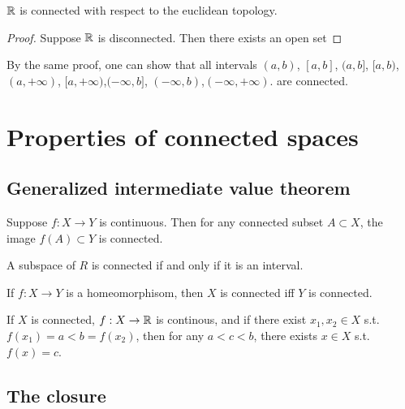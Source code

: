 \begin{proposition}{}{}
    $\mathbb{R}$ is connected with respect to the euclidean topology.
\end{proposition}

\begin{proof}
    Suppose $\mathbb{R}$ is disconnected. Then there exists an open set 
\end{proof}

\begin{remark}
    By the same proof, one can show that all intervals
$(a, b)$, $[a, b]$, $(a, b]$, $[a, b)$,$(a,+\infty)$, $[a, +\infty)$,$(-\infty, b]$,
$(-\infty, b)$,$(-\infty, +\infty)$.
are connected.
\end{remark}









\section{Properties of connected spaces}
\subsection{Generalized intermediate value theorem}
\begin{proposition}{}{}
    Suppose $f:X\rightarrow Y$ is continuous. 
    Then for any connected subset $A\subset X$, 
    the image $f(A)\subset Y$ is connected.
\end{proposition}

\begin{proposition}{}{}
    A subspace of $R$ is connected if and only if it is an interval.
\end{proposition}

\begin{corollary}
    If $f:X\rightarrow Y$ is a homeomorphisom, then $X$ is connected iff $Y$ is connected.
\end{corollary}

\begin{corollary}{}{}
    If $X$ is connected, $f:X\rightarrow \mathbb{R}$ is continous, 
    and if there exist $x_1,x_2\in X$ s.t. $f(x_1)=a<b=f(x_2)$,
    then for any $a<c<b$, there exists $x\in X$ s.t. $f(x)=c$.
\end{corollary}

\subsection{The closure}

